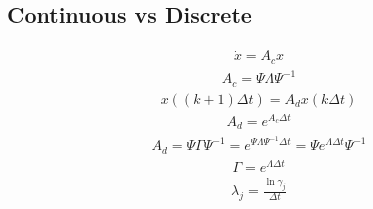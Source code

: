 \documentclass[letterpaper,10pt,english]{sphinxmanual}
\begin{document}
\subsection{Continuous vs Discrete}
\label{\detokenize{examples/05_MIMO_Event:Continuous-vs-Discrete}}\begin{equation*}
\begin{split}\dot{x} = A_{c}x\end{split}
\end{equation*}\begin{equation*}
\begin{split}A_{c} = \Psi \Lambda \Psi^{-1}\end{split}
\end{equation*}\begin{equation*}
\begin{split}x\left((k+1)\Delta t\right) = A_{d}x(k\Delta t)\end{split}
\end{equation*}\begin{equation*}
\begin{split}A_{d} = e^{A_{c}\Delta t}\end{split}
\end{equation*}\begin{equation*}
\begin{split}A_{d} = \Psi \Gamma \Psi^{-1} = e^{\Psi \Lambda \Psi^{-1}\Delta t} = {\Psi e^{\Lambda\Delta t}\Psi^{-1}}\end{split}
\end{equation*}\begin{equation*}
\begin{split}\Gamma = e^{\Lambda\Delta t}\end{split}
\end{equation*}\begin{equation*}
\begin{split}\lambda_{j} = \frac{\ln{\gamma_{j}}}{\Delta t}\end{split}
\end{equation*}
\end{document}
